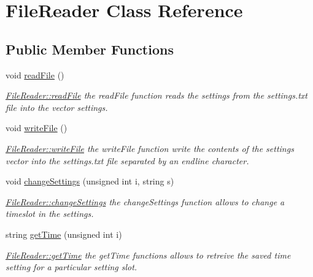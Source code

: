 \hypertarget{class_file_reader}{}\section{File\+Reader Class Reference}
\label{class_file_reader}
\subsection*{Public Member Functions}
\begin{DoxyCompactItemize}
\item 
\hypertarget{class_file_reader_a34d1e57721856a4ec1d7f567aa0daf33}{}void \hyperlink{class_file_reader_a34d1e57721856a4ec1d7f567aa0daf33}{read\+File} ()\label{class_file_reader_a34d1e57721856a4ec1d7f567aa0daf33}

\begin{DoxyCompactList}\small\item\em \hyperlink{class_file_reader_a34d1e57721856a4ec1d7f567aa0daf33}{File\+Reader\+::read\+File} the read\+File function reads the settings from the settings.\+txt file into the vector settings. \end{DoxyCompactList}\item 
\hypertarget{class_file_reader_a06f1ab4a931d05cb7a038692c4987406}{}void \hyperlink{class_file_reader_a06f1ab4a931d05cb7a038692c4987406}{write\+File} ()\label{class_file_reader_a06f1ab4a931d05cb7a038692c4987406}

\begin{DoxyCompactList}\small\item\em \hyperlink{class_file_reader_a06f1ab4a931d05cb7a038692c4987406}{File\+Reader\+::write\+File} the write\+File function write the contents of the settings vector into the settings.\+txt file separated by an endline character. \end{DoxyCompactList}\item 
void \hyperlink{class_file_reader_aead27429cd175a41667790567cceaafd}{change\+Settings} (unsigned int i, string s)
\begin{DoxyCompactList}\small\item\em \hyperlink{class_file_reader_aead27429cd175a41667790567cceaafd}{File\+Reader\+::change\+Settings} the change\+Settings function allows to change a timeslot in the settings. \end{DoxyCompactList}\item 
string \hyperlink{class_file_reader_aed9eaba4d0d115bb425ea703a4ee5052}{get\+Time} (unsigned int i)
\begin{DoxyCompactList}\small\item\em \hyperlink{class_file_reader_aed9eaba4d0d115bb425ea703a4ee5052}{File\+Reader\+::get\+Time} the get\+Time functions allows to retreive the saved time setting for a particular setting slot. \end{DoxyCompactList}\end{DoxyCompactItemize}


